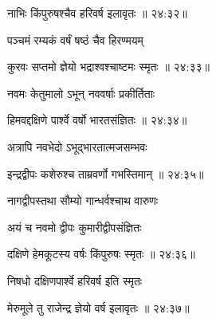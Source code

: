 
{\devanagarifont नाभिः किंपुरुषश्चैव हरिवर्ष इलावृतः {॥ २४:३२॥} \veg\dontdisplaylinenum }%

{\devanagarifont पञ्चमं रम्यकं वर्षं षष्ठं चैव हिरण्मयम् \thinspace{\dandab} \dontdisplaylinenum }%
 

{\devanagarifont कुरवः सप्तमो ज्ञेयो भद्राश्वश्चाष्टमः स्मृतः {॥ २४:३३॥} \veg\dontdisplaylinenum }%

{\devanagarifont नवमः केतुमालो ऽभून् नववर्षाः प्रकीर्तिताः \thinspace{\dandab} \dontdisplaylinenum }%


{\devanagarifont हिमवद्दक्षिणे पार्श्वे वर्षो भारतसंज्ञितः {॥ २४:३४॥} \veg\dontdisplaylinenum }%

{\devanagarifont अत्रापि नवभेदो ऽभूद्भारतात्मजसम्भवः \thinspace{\dandab} \dontdisplaylinenum }%


{\devanagarifont इन्द्रद्वीपः कशेरुश्च ताम्रवर्णो गभस्तिमान् {॥ २४:३५॥} \veg\dontdisplaylinenum }%
 
{\devanagarifont नागद्वीपस्तथा सौम्यो गान्धर्वश्चाथ वारुणः \thinspace{\dandab} \dontdisplaylinenum }%

{\devanagarifont अयं च नवमो द्वीपः कुमारीद्वीपसंज्ञितः  \danda\dontdisplaylinenum }%
 

{\devanagarifont दक्षिणे हेमकूटस्य वर्षः किंपुरुषः स्मृतः {॥ २४:३६॥} \veg\dontdisplaylinenum }%
 
{\devanagarifont निषधो दक्षिणपार्श्वे हरिवर्ष इति स्मृतः \thinspace{\dandab} \dontdisplaylinenum }%
 

{\devanagarifont मेरुमूले तु राजेन्द्र ज्ञेयो वर्ष इलावृतः {॥ २४:३७॥} \veg\dontdisplaylinenum }%
 
